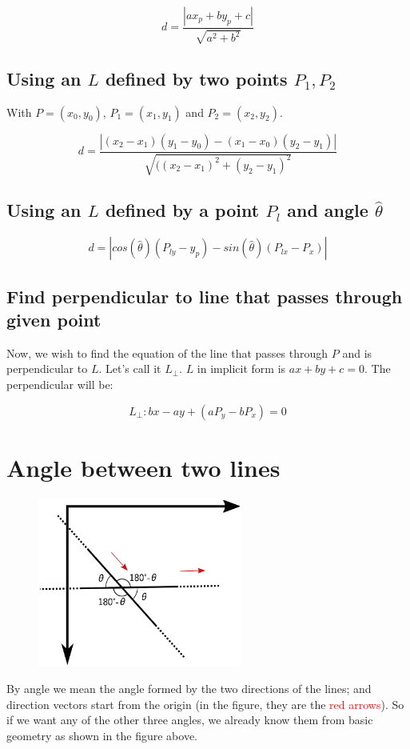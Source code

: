 \documentclass[12pt,openany,a4,usenames,dvipsnames]{book}
\begin{document}
$$d= \frac{|ax_p+by_p+c|}{\sqrt{a^2+b^2}}$$

\section{Using an $L$ defined by two points $P_1, P_2$}
With $P=(x_0, y_0)$, $P_1 = (x_1, y_1)$ and $P_2 = (x_2, y_2)$.

$$d=\frac{|(x_2-x_1)(y_1-y_0)-(x_1-x_0)(y_2-y_1)|}{\sqrt{((x_2-x_1)^2+(y_2-y_1)^2}}$$
\section{Using an $L$ defined by a point $P_l$ and angle $\hat{θ}$}

$$d=|cos(\hat{θ})(P_{ly}-y_p)-sin(\hat{θ})(P_{lx} - P_x)|$$

\section{Find perpendicular to line that passes through given point}\label{sec:perpendicular}
Now, we wish to find the equation of the line that passes through $P$ and is perpendicular to $L$. Let's call it $L_{⊥}$. $L$ in implicit form is $ax+by+c=0$. The perpendicular will be:

$$L_{⊥}: bx-ay+(aP_y-bP_x)=0$$
\chapter{Angle between two lines}
\begin{figure}[H]
\centering
\includegraphics[width=0.6\textwidth,keepaspectratio]{figures/line_angles.pdf}
\end{figure}
By angle we mean the angle formed by the two directions of the lines; and direction vectors start from the origin (in the figure, they are the \textcolor{red}{red arrows}). So if we want any of the other three angles, we already know them from basic geometry as shown in the figure above.
\end{document}
